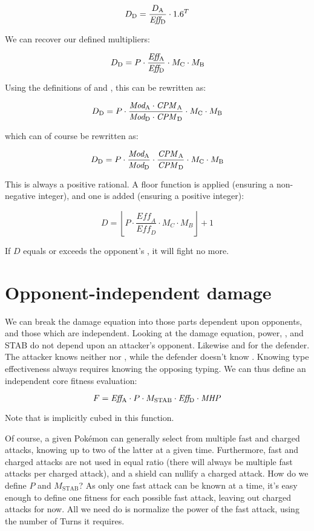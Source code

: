 \[ D_\mathrm{D} = \frac{D_\mathrm{A}}{\mbox{$\mathit{Eff_\mathrm{D}}$}} \cdot 1.6^T \]

We can recover our defined multipliers:

\[ D_\mathrm{D} = P \cdot \frac{\mbox{$\mathit{Eff_\mathrm{A}}$}}{\mbox{$\mathit{Eff_\mathrm{D}}$}} \cdot M_\mathrm{C} \cdot M_\mathrm{B} \]

Using the definitions of  and , this can be rewritten as:

\[ D_\mathrm{D} = P \cdot \frac{\mbox{$\mathit{Mod_\mathrm{A}}$} \cdot \mbox{$\mathit{CPM}$}_\mathrm{A}}{\mbox{$\mathit{Mod_\mathrm{D}}$} \cdot \mbox{$\mathit{CPM}$}_\mathrm{D}} \cdot M_\mathrm{C} \cdot M_\mathrm{B} \]

which can of course be rewritten as:

\[ D_\mathrm{D} = P \cdot \frac{\mbox{$\mathit{Mod_\mathrm{A}}$}}{\mbox{$\mathit{Mod_\mathrm{D}}$}} \cdot \frac{\mbox{$\mathit{CPM}$}_\mathrm{A}}{\mbox{$\mathit{CPM}$}_\mathrm{D}} \cdot M_\mathrm{C} \cdot M_\mathrm{B} \]

This is always a positive rational.
A floor function is applied (ensuring a non-negative integer),
 and one is added (ensuring a positive integer):

\[ D = \left\lfloor P \cdot \frac{\mathit{Eff_A}}{\mathit{Eff_D}} \cdot M_C \cdot M_B \right\rfloor + 1 \]

If $D$ equals or exceeds the opponent's \HP, it will fight no more.

\section{Opponent-independent damage}
We can break the damage equation into those parts dependent upon opponents, and those which are independent.
Looking at the damage equation, power, , and STAB do not depend upon an attacker's opponent.
Likewise  and \MHP{} for the defender.
The attacker knows neither  nor \MHP, while the defender doesn't know .
Knowing type effectiveness always requires knowing the opposing typing.
We can thus define an independent core fitness evaluation:

\[ F = \mbox{$\mathit{Eff_\mathrm{A}}$} \cdot P \cdot M_\mathrm{STAB} \cdot \mbox{$\mathit{Eff_\mathrm{D}}$} \cdot \mbox{$\mathit{MHP}$} \]

Note that \CPM{} is implicitly cubed in this function.

Of course, a given Pokémon can generally select from multiple fast and charged attacks,
  knowing up to two of the latter at a given time.
Furthermore, fast and charged attacks are not used in equal ratio (there will
  always be multiple fast attacks per charged attack), and a shield can
  nullify a charged attack.
How do we define $P$ and $M_\mathrm{STAB}$?
As only one fast attack can be known at a time, it's easy enough to define one
  fitness for each possible fast attack, leaving out charged attacks for now.
All we need do is normalize the power of the fast attack, using the number of
  Turns it requires.

